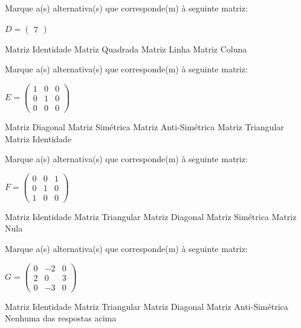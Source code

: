 \documentclass[pdftex, brazil, 12pt, oneside, addpoints]{exam}
\begin{document}
\begin{questions}
\question
Marque a(s) alternativa(s) que corresponde(m) à seguinte matriz:

\hspace{5cm}$D = \begin{pmatrix}
  7
\end{pmatrix}$
\begin{checkboxes}
  \choice Matriz Identidade
  \CorrectChoice Matriz Quadrada
  \CorrectChoice Matriz Linha
  \CorrectChoice Matriz Coluna
\end{checkboxes}

\question
Marque a(s) alternativa(s) que corresponde(m) à seguinte matriz:

\hspace{5cm}$E = \begin{pmatrix}
  1 & 0 & 0\\
  0 & 1 & 0\\
  0 & 0 & 0
\end{pmatrix}$
\begin{checkboxes}
  \CorrectChoice Matriz Diagonal
  \CorrectChoice Matriz Simétrica
  \choice Matriz Anti-Simétrica
  \choice Matriz Triangular
  \choice Matriz Identidade
\end{checkboxes}

\question
Marque a(s) alternativa(s) que corresponde(m) à seguinte matriz:

\hspace{5cm}$F = \begin{pmatrix}
  0 & 0 & 1\\
  0 & 1 & 0\\
  1 & 0 & 0
\end{pmatrix}$
\begin{checkboxes}
  \choice Matriz Identidade
  \choice Matriz Triangular
  \choice Matriz Diagonal
  \CorrectChoice Matriz Simétrica
  \choice Matriz Nula
\end{checkboxes}

\question
Marque a(s) alternativa(s) que corresponde(m) à seguinte matriz:

\hspace{5cm}$G = \begin{pmatrix}
  0 & -2 & 0\\
  2 & 0 & 3\\
  0 & -3 & 0
\end{pmatrix}$
\begin{checkboxes}
  \choice Matriz Identidade
  \choice Matriz Triangular
  \choice Matriz Diagonal
  \CorrectChoice Matriz Anti-Simétrica
  \choice Nenhuma das respostas acima
\end{checkboxes}


\end{questions}
\end{document}
